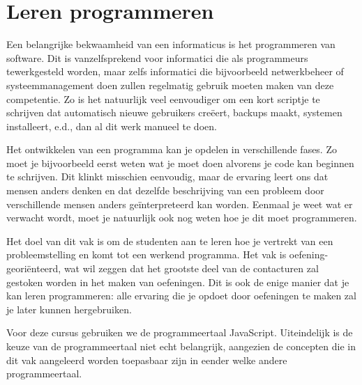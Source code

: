 \chapter{Leren programmeren}
Een belangrijke bekwaamheid van een informaticus is het programmeren van software.
Dit is vanzelfsprekend voor informatici die als programmeurs tewerkgesteld worden,
maar zelfs informatici die bijvoorbeeld netwerkbeheer of systeemmanagement doen zullen
regelmatig gebruik moeten maken van deze competentie. Zo is het natuurlijk veel
eenvoudiger om een kort scriptje te schrijven dat automatisch nieuwe gebruikers
cre\"eert, backups maakt, systemen installeert, e.d., dan al dit werk manueel te doen.

Het ontwikkelen van een programma kan je opdelen in verschillende fases. Zo moet
je bijvoorbeeld eerst weten wat je moet doen alvorens je code kan beginnen te schrijven.
Dit klinkt misschien eenvoudig, maar de ervaring leert ons dat mensen anders denken en
dat dezelfde beschrijving van een probleem door verschillende mensen anders ge\"interpreteerd
kan worden. Eenmaal je weet wat er verwacht wordt, moet je natuurlijk ook nog
weten hoe je dit moet programmeren.

Het doel van dit vak is om de studenten aan te leren hoe je vertrekt van een probleemstelling
en komt tot een werkend programma. Het vak is oefening-geori\"enteerd, wat wil zeggen dat het
grootste deel van de contacturen zal gestoken worden in het maken van oefeningen. Dit is ook de
enige manier dat je kan leren programmeren: alle ervaring die je opdoet door oefeningen te maken
zal je later kunnen hergebruiken.

Voor deze cursus gebruiken we de programmeertaal JavaScript. Uiteindelijk is de keuze van de
programmeertaal niet echt belangrijk, aangezien de concepten die in dit vak aangeleerd worden
toepasbaar zijn in eender welke andere programmeertaal.


